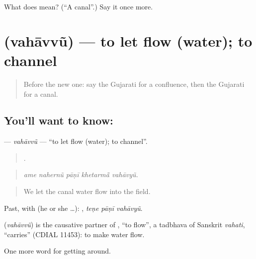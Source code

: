 \begin{tcolorbox}[breakable,colback=teal!4,colframe=teal!35!black,title={Before you move on}]
What does  mean? (\textquotedblleft{}A canal\textquotedblright{}.) Say it once more.
\end{tcolorbox}
\section[\texorpdfstring{\gu{વહાવવું} (vahāvvũ)}{વહાવવું (vahāvvũ)}]{ (vahāvvũ) — to let flow (water); to channel}

\label{lesson:GU-C440-vahavvu}



\begin{quote}
Before the new one: say the Gujarati for a confluence, then the Gujarati for a canal.
\end{quote}

\subsection*{You'll want to know: }
\textbf{} — \emph{vahāvvũ} — \textquotedblleft{}to let flow (water); to channel\textquotedblright{}.

\begin{quote}
    .
\end{quote}

\begin{quote}
\emph{ame nahernũ pāṇī khetarmā̃ vahāvyũ.}
\end{quote}

\begin{quote}
We let the canal water flow into the field.
\end{quote}

Past, with  (he or she …):   , \emph{teṇe pāṇī vahāvyũ}.

\begin{cousinweb}
\textbf{} (\emph{vahāvvũ}) is the causative partner of , \textquotedblleft{}to flow\textquotedblright{}, a tadbhava of Sanskrit \emph{vahati}, \textquotedblleft{}carries\textquotedblright{} (CDIAL 11453): to make water flow.
\end{cousinweb}

\begin{grammarlens}[title={What you've built}]
One more word for getting around.
\end{grammarlens}

